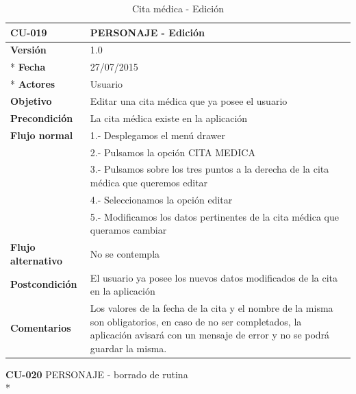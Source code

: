 \documentclass[../pfc.tex]{subfiles}
\begin{document}
		\begin{table}[H]
			\centering
			\begin{tabular}[t]{|p{3cm}|p{9.5cm}|}
				\hline \textbf{CU-019} & \textbf{PERSONAJE - Edición} \\*
				\hline\hline \textbf{Versión} & 1.0 \\ *
				\hline\hline \textbf{Fecha} & 27/07/2015 \\ *
				\hline\textbf{Actores} 	& Usuario\\*
				\hline \textbf{Objetivo} & Editar una cita médica que ya posee el usuario\\* 			
				\hline \textbf{Precondición} & La cita médica existe en la aplicación\\* 
				\hline \textbf{Flujo normal} & 1.- Desplegamos el menú drawer \\* 
				& 2.- Pulsamos la opción CITA MEDICA\\*	
				& 3.- Pulsamos sobre los tres puntos a la derecha de la cita médica que queremos editar\\*	
				& 4.- Seleccionamos la opción editar\\*	
				& 5.- Modificamos los datos pertinentes de la cita médica que queramos cambiar\\*	
				\hline \textbf{Flujo alternativo} & No se contempla \\* 
				\hline \textbf{Postcondición} & El usuario ya posee los nuevos datos modificados de la cita en la aplicación \\* 
				\hline \textbf{Comentarios}   & Los valores de la fecha de la cita y el nombre de la misma son obligatorios, en caso de no ser completados, la aplicación avisará con un mensaje de error y no se podrá guardar la misma.\\*
				\hline
			\end{tabular}
			\caption{Cita médica - Edición}
			\label{tabla:caso019}
		\end{table}
		
		
		
		\textbf{CU-020}	PERSONAJE - borrado de rutina\\*
		
\end{document}
